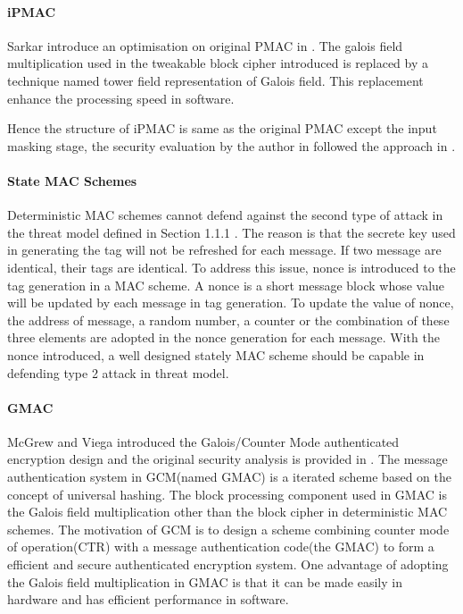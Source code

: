 \documentclass{article}
\begin{document}
\paragraph{iPMAC}
Sarkar introduce an optimisation on original PMAC in \cite{iPMAC}. The galois field multiplication used in the tweakable block cipher introduced is replaced by a technique named tower field representation of Galois field. This replacement enhance the processing speed in software.

Hence the structure of iPMAC is same as the original PMAC except the input masking stage, the security evaluation by the author in \cite{iPMAC} followed the approach in \cite{pmac}.

\paragraph{State MAC Schemes}
Deterministic MAC schemes cannot defend against the second type of attack in the threat model defined in Section 1.1.1 . The reason is that the secrete key used in generating the tag will not be refreshed for each message. If two message are identical, their tags are identical. To address this issue, nonce is introduced to the tag generation in a MAC scheme. A nonce is a short message block whose value will be updated by each message in tag generation. To update the value of nonce, the address of message, a random number, a counter or the combination of these three elements are adopted in the nonce generation for each message. With the nonce introduced, a well designed stately MAC scheme should be capable in defending type 2 attack in threat model.
\paragraph{GMAC}
McGrew and Viega introduced the Galois/Counter Mode authenticated encryption design and the original security analysis is provided in \cite{gcm}. The message authentication system in GCM(named GMAC) is a iterated scheme based on the concept of universal hashing. The block processing component used in GMAC is the Galois field multiplication other than the block cipher in deterministic MAC schemes. 
The motivation of GCM is to design a scheme combining counter mode of operation(CTR) with a message authentication code(the GMAC) to form a efficient and secure authenticated encryption system.
One advantage of adopting the Galois field multiplication in GMAC is that it can be made easily in hardware and has efficient performance in software. 
\end{document}
